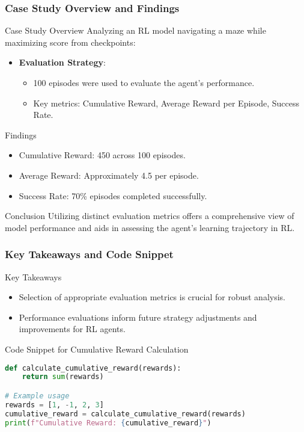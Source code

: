 \documentclass{beamer}
\begin{document}
\begin{frame}[fragile]
    \frametitle{Case Study Overview and Findings}
    \begin{block}{Case Study Overview}
        Analyzing an RL model navigating a maze while maximizing score from checkpoints:
        \begin{itemize}
            \item \textbf{Evaluation Strategy}:
                \begin{itemize}
                    \item 100 episodes were used to evaluate the agent's performance.
                    \item Key metrics: Cumulative Reward, Average Reward per Episode, Success Rate.
                \end{itemize}
        \end{itemize}
    \end{block}
    
    \begin{block}{Findings}
        \begin{itemize}
            \item Cumulative Reward: 450 across 100 episodes.
            \item Average Reward: Approximately 4.5 per episode.
            \item Success Rate: 70\% episodes completed successfully.
        \end{itemize}
    \end{block}
    
    \begin{block}{Conclusion}
        Utilizing distinct evaluation metrics offers a comprehensive view of model performance and aids in assessing the agent’s learning trajectory in RL.
    \end{block}
\end{frame}

\begin{frame}[fragile]
    \frametitle{Key Takeaways and Code Snippet}
    \begin{block}{Key Takeaways}
        \begin{itemize}
            \item Selection of appropriate evaluation metrics is crucial for robust analysis.
            \item Performance evaluations inform future strategy adjustments and improvements for RL agents.
        \end{itemize}
    \end{block}
    
    \begin{block}{Code Snippet for Cumulative Reward Calculation}
    \begin{lstlisting}[language=Python]
def calculate_cumulative_reward(rewards):
    return sum(rewards)

# Example usage
rewards = [1, -1, 2, 3]
cumulative_reward = calculate_cumulative_reward(rewards)
print(f"Cumulative Reward: {cumulative_reward}")
    \end{lstlisting}
    \end{block}
\end{frame}
\end{document}
